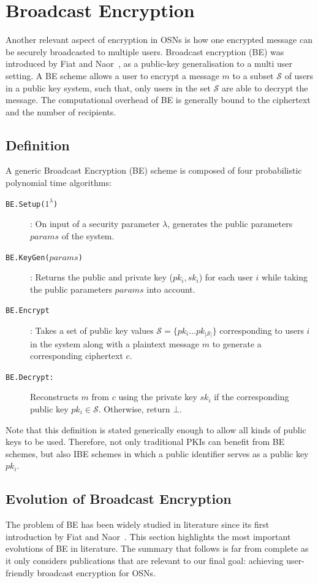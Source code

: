 \section{Broadcast Encryption}
Another relevant aspect of encryption in OSNs is how one encrypted message can be securely broadcasted to multiple users. Broadcast encryption (BE) was introduced by Fiat and Naor~\cite{art:FiatN93}, as a public-key generalisation to a multi user setting. A BE scheme allows a user to encrypt a message $m$ to a subset $\mathcal{S}$ of users in a public key system, such that, only users in the set $\mathcal{S}$ are able to decrypt the message. The computational overhead of BE is generally bound to the ciphertext and the number of recipients.

\subsection{Definition}
A generic Broadcast Encryption (BE) scheme is composed of four probabilistic polynomial time algorithms:

\begin{description}
    \item[\texttt{BE.Setup($1^{\lambda}$)}]: On input of a security parameter $\lambda$, generates the public parameters $params$ of the system.
    \item[\texttt{BE.KeyGen($params$)}]: Returns the public and private key ($pk_i,sk_i$) for each user $i$ while taking the public parameters $params$ into account.
    \item[\texttt{BE.Encrypt}]: Takes a set of public key values $\mathcal{S}=\{pk_i \ldots pk_{|\mathcal{S}|}\}$ corresponding to users $i$ in the system along with a plaintext message $m$ to generate a corresponding ciphertext $c$.
    \item[\texttt{BE.Decrypt:}] Reconstructs $m$ from $c$ using the private key $sk_i$ if the corresponding public key $pk_i \in \mathcal{S}$. Otherwise, return $\bot$.
\end{description}

Note that this definition is stated generically enough to allow all kinds of public keys to be used. Therefore, not only traditional PKIs can benefit from BE schemes, but also IBE schemes in which a public identifier  serves as a public key $pk_i$.

\subsection{Evolution of Broadcast Encryption}
\label{sec:evolution_of_be}
The problem of BE has been widely studied in literature since its first introduction by Fiat and Naor~\cite{art:FiatN93}. This section highlights the most important evolutions of BE in literature. The summary that follows is far from complete as it only considers publications that are relevant to our final goal: achieving user-friendly broadcast encryption for OSNs.

